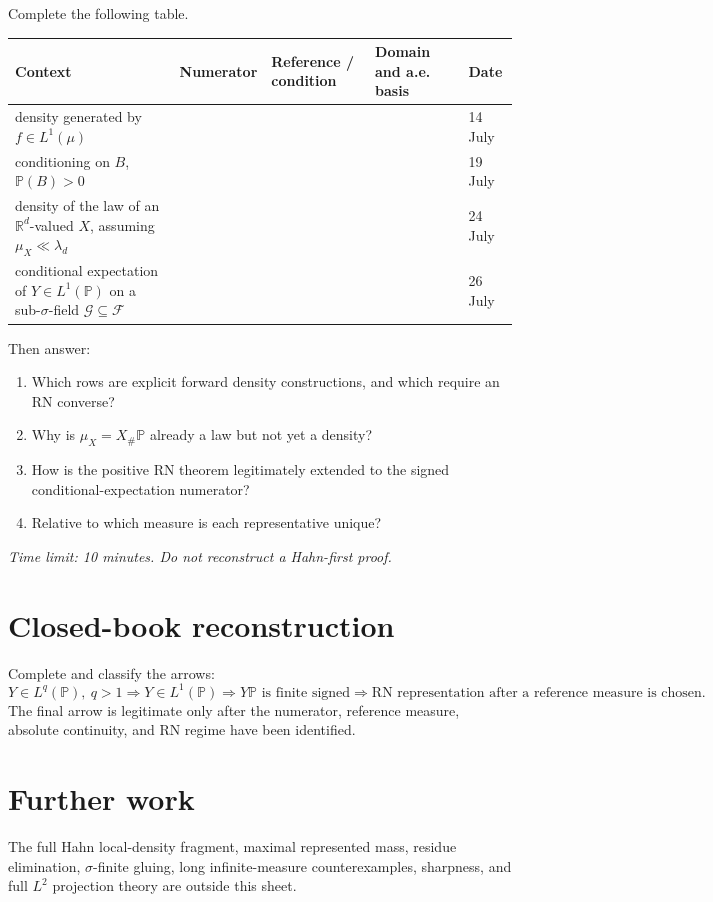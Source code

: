Complete the following table.

\begin{center}
\begin{tabular}{p{32mm}p{34mm}p{31mm}p{30mm}p{21mm}}
\textbf{Context} & \textbf{Numerator} & \textbf{Reference / condition} & \textbf{Domain and a.e. basis} & \textbf{Date}\\
\hline
density generated by $f\in L^1(\mu)$ & & & & 14 July\\[2.0em]
conditioning on $B$, $\mathbb P(B)>0$ & & & & 19 July\\[2.0em]
density of the law of an $\mathbb R^d$-valued $X$, assuming $\mu_X\ll\lambda_d$ & & & & 24 July\\[2.0em]
conditional expectation of $Y\in L^1(\mathbb P)$ on a sub-$\sigma$-field $\mathcal G\subseteq\mathcal F$ & & & & 26 July
\end{tabular}
\end{center}

Then answer:
\begin{enumerate}
  \item Which rows are explicit forward density constructions, and which require an RN converse?
  \item Why is $\mu_X=X_\#\mathbb P$ already a law but not yet a density?
  \item How is the positive RN theorem legitimately extended to the signed conditional-expectation numerator?
  \item Relative to which measure is each representative unique?
\end{enumerate}

\emph{Time limit: 10 minutes. Do not reconstruct a Hahn-first proof.}

\section*{Closed-book reconstruction}

Complete and classify the arrows:
\[
\boxed{Y\in L^q(\mathbb P),\ q>1}
\Longrightarrow
\boxed{Y\in L^1(\mathbb P)}
\Longrightarrow
\boxed{Y\mathbb P\text{ is finite signed}}
\Longrightarrow
\boxed{\text{RN representation after a reference measure is chosen}}.
\]
The final arrow is legitimate only after the numerator, reference measure, absolute continuity, and RN regime have been identified.

\section*{Further work}

The full Hahn local-density fragment, maximal represented mass, residue elimination, $\sigma$-finite gluing, long infinite-measure counterexamples, sharpness, and full $L^2$ projection theory are outside this sheet.
